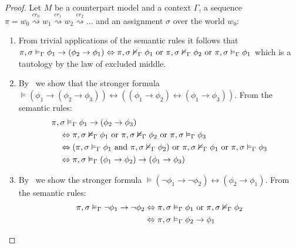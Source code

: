 \begin{proof}
  Let $M$ be a counterpart model and a context $\Gamma$, a sequence $\pi = w_0 \overset{cr_0}{\rightsquigarrow} w_1 \overset{cr_1}{\rightsquigarrow} w_2 \overset{cr_2}{\rightsquigarrow} \ldots$ and an assignment $\sigma$ over the world $w_0$:
  \begin{enumerate}
    \item From trivial applications of the semantic rules it follows that ${\pi}, {\sigma} \vDash_{\Gamma} {\phi_1 \to (\phi_2
      \to \phi_1)} \Leftrightarrow {\pi}, {\sigma} \nvDash_{\Gamma} {\phi_1} \text{ or } {\pi}, {\sigma} \nvDash_{\Gamma} {\phi_2}
      \text{ or } {\pi}, {\sigma} \vDash_{\Gamma} {\phi_1}$ which is a tautology by the law of excluded middle.

    \item By~ we show that the stronger formula $\vDash (\phi_1 \to (\phi_2 \to \phi_3)) \leftrightarrow ((\phi_1 \to \phi_2)
      \leftrightarrow (\phi_1 \to \phi_3))$. From the semantic rules:
      \[
        \begin{split}
          &{\pi}, {\sigma} \vDash_{\Gamma} {\phi_1 \to (\phi_2 \to \phi_3)} \\
            &\quad\Leftrightarrow {\pi}, {\sigma} \nvDash_{\Gamma} {\phi_1} \text{ or } {\pi}, {\sigma} \nvDash_{\Gamma} {\phi_2} \text{ or }
              {\pi}, {\sigma} \vDash_{\Gamma} {\phi_3} \\
            &\quad\Leftrightarrow ({\pi}, {\sigma} \vDash_{\Gamma} {\phi_1} \text{ and } {\pi}, {\sigma} \nvDash_{\Gamma} {\phi_2}) \text{ or }
              {\pi}, {\sigma} \nvDash_{\Gamma} {\phi_1} \text{ or } {\pi}, {\sigma} \vDash_{\Gamma} {\phi_3} \\
            &\quad\Leftrightarrow {\pi}, {\sigma} \vDash_{\Gamma} {(\phi_1 \to \phi_2) \to (\phi_1 \to \phi_3)}
        \end{split}
      \]

    \item By~ we show the stronger formula $\vDash (\neg\phi_1 \to \neg\phi_2) \leftrightarrow (\phi_2 \to \phi_1)$.
      From the semantic rules:
      \[
        \begin{split}
          {\pi}, {\sigma} \vDash_{\Gamma} {\neg\phi_1 \to \neg\phi_2}
            &\Leftrightarrow {\pi}, {\sigma} \vDash_{\Gamma} {\phi_1} \text{ or } {\pi}, {\sigma} \nvDash_{\Gamma} {\phi_2} \\
            &\Leftrightarrow {\pi}, {\sigma} \vDash_{\Gamma} {\phi_2 \to \phi_1}
        \end{split}
      \]
  \end{enumerate}
\end{proof}

